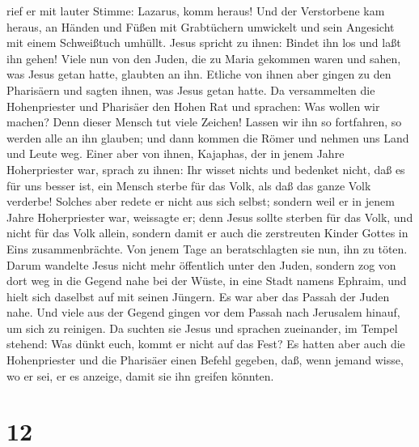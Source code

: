 rief er mit lauter Stimme: Lazarus, komm heraus!  Und der
Verstorbene kam heraus, an Händen und Füßen mit Grabtüchern umwickelt
und sein Angesicht mit einem Schweißtuch umhüllt. Jesus spricht zu
ihnen: Bindet ihn los und laßt ihn gehen!  Viele nun von
den Juden, die zu Maria gekommen waren und sahen, was Jesus getan hatte,
glaubten an ihn.  Etliche von ihnen aber gingen zu den
Pharisäern und sagten ihnen, was Jesus getan hatte.  Da
versammelten die Hohenpriester und Pharisäer den Hohen Rat und sprachen:
Was wollen wir machen? Denn dieser Mensch tut viele Zeichen!
 Lassen wir ihn so fortfahren, so werden alle an ihn
glauben; und dann kommen die Römer und nehmen uns Land und Leute weg.
 Einer aber von ihnen, Kajaphas, der in jenem Jahre
Hoherpriester war, sprach zu ihnen:  Ihr wisset nichts
und bedenket nicht, daß es für uns besser ist, ein Mensch sterbe für das
Volk, als daß das ganze Volk verderbe!  Solches aber
redete er nicht aus sich selbst; sondern weil er in jenem Jahre
Hoherpriester war, weissagte er; denn Jesus sollte sterben für das Volk,
 und nicht für das Volk allein, sondern damit er auch die
zerstreuten Kinder Gottes in Eins zusammenbrächte.  Von
jenem Tage an beratschlagten sie nun, ihn zu töten. 
Darum wandelte Jesus nicht mehr öffentlich unter den Juden, sondern zog
von dort weg in die Gegend nahe bei der Wüste, in eine Stadt namens
Ephraim, und hielt sich daselbst auf mit seinen Jüngern. 
Es war aber das Passah der Juden nahe. Und viele aus der Gegend gingen
vor dem Passah nach Jerusalem hinauf, um sich zu reinigen.
 Da suchten sie Jesus und sprachen zueinander, im Tempel
stehend: Was dünkt euch, kommt er nicht auf das Fest?  Es
hatten aber auch die Hohenpriester und die Pharisäer einen Befehl
gegeben, daß, wenn jemand wisse, wo er sei, er es anzeige, damit sie ihn
greifen könnten.

\hypertarget{section-11}{%
\section{12}\label{section-11}}

